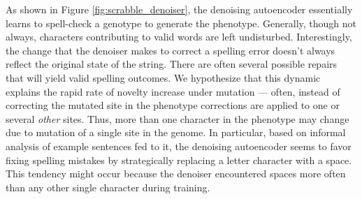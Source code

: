 As shown in Figure \ref{fig:scrabble_denoiser}, the denoising autoencoder essentially learns to spell-check a genotype to generate the phenotype.
Generally, though not always, characters contributing to valid words are left undisturbed.
Interestingly, the change that the denoiser makes to correct a spelling error doesn't always reflect the original state of the string.
There are often several possible repairs that will yield valid spelling outcomes.
We hypothesize that this dynamic explains the rapid rate of novelty increase under mutation --- often, instead of correcting the mutated site in the phenotype corrections are applied to one or several \textit{other} sites.
Thus, more than one character in the phenotype may change due to mutation of a single site in the genome.
In particular, based on informal analysis of example sentences fed to it, the denoising autoencoder seems to favor fixing spelling mistakes by strategically replacing a letter character with a space.
This tendency might occur because the denoiser encountered spaces more often than any other single character during training.
